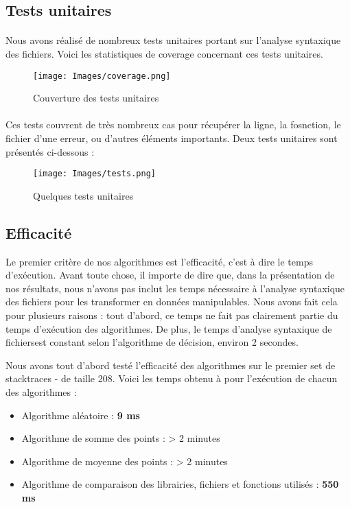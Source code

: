 \documentclass{article}
\begin{document}
\subsection{Tests unitaires}

\paragraph{}
Nous avons réalisé de nombreux tests unitaires portant sur l'analyse syntaxique des fichiers. Voici les statistiques de coverage concernant ces tests unitaires.

\begin{figure}[h]
   \texttt{[image: Images/coverage.png]}
   \caption{Couverture des tests unitaires}
\end{figure}

\paragraph{}
Ces tests couvrent de très nombreux cas pour récupérer la ligne, la fosnction, le fichier d'une erreur, ou d'autres éléments importants. Deux tests unitaires sont présentés ci-dessous :

\begin{figure}[h]
   \texttt{[image: Images/tests.png]}
   \caption{Quelques tests unitaires}
\end{figure}


\subsection{Efficacité}

Le premier critère de nos algorithmes est l'efficacité, c'est à dire le temps d'exécution. Avant toute chose, il importe de dire que, dans la présentation de nos résultats, nous n'avons pas inclut les temps nécessaire à l'analyse syntaxique des fichiers pour les transformer en données manipulables. Nous avons fait cela pour plusieurs raisons : tout d'abord, ce temps ne fait pas clairement partie du temps d'exécution des algorithmes. De plus, le temps d'analyse syntaxique de fichiersest constant selon l'algorithme de décision, environ 2 secondes.

Nous avons tout d'abord testé l'efficacité des algorithmes sur le premier set de stacktraces - de taille 208. Voici les temps obtenu à pour l'exécution de chacun des algorithmes :

\begin{itemize}
\item Algorithme aléatoire : \textbf{9 ms}
\item Algorithme de somme des points : > 2 minutes
\item Algorithme de moyenne des points : > 2 minutes
\item Algorithme de comparaison des librairies, fichiers et fonctions utilisés : \textbf{550 ms}
\end{itemize}
\end{document}
